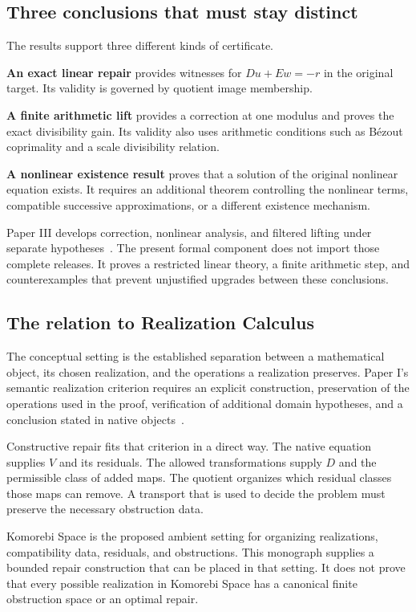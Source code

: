 \subsection{Three conclusions that must stay distinct}
The results support three different kinds of certificate.

\textbf{An exact linear repair} provides witnesses for $Du+Ew=-r$ in the original target. Its validity is governed by quotient image membership.

\textbf{A finite arithmetic lift} provides a correction at one modulus and proves the exact divisibility gain. Its validity also uses arithmetic conditions such as B\'ezout coprimality and a scale divisibility relation.

\textbf{A nonlinear existence result} proves that a solution of the original nonlinear equation exists. It requires an additional theorem controlling the nonlinear terms, compatible successive approximations, or a different existence mechanism.

Paper III develops correction, nonlinear analysis, and filtered lifting under separate hypotheses~\cite{CR:paperiii}. The present formal component does not import those complete releases. It proves a restricted linear theory, a finite arithmetic step, and counterexamples that prevent unjustified upgrades between these conclusions.

\subsection{The relation to Realization Calculus}\label{CR:sec:realization}
The conceptual setting is the established separation between a mathematical object, its chosen realization, and the operations a realization preserves. Paper I's semantic realization criterion requires an explicit construction, preservation of the operations used in the proof, verification of additional domain hypotheses, and a conclusion stated in native objects~\cite{CR:paperi}.

Constructive repair fits that criterion in a direct way. The native equation supplies $V$ and its residuals. The allowed transformations supply $D$ and the permissible class of added maps. The quotient organizes which residual classes those maps can remove. A transport that is used to decide the problem must preserve the necessary obstruction data.

Komorebi Space is the proposed ambient setting for organizing realizations, compatibility data, residuals, and obstructions. This monograph supplies a bounded repair construction that can be placed in that setting. It does not prove that every possible realization in Komorebi Space has a canonical finite obstruction space or an optimal repair.

